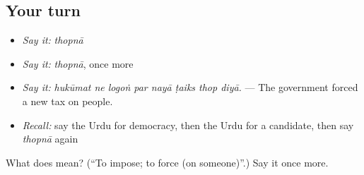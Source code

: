 \subsection*{Your turn}
\begin{itemize}
\raggedright
  \item \emph{Say it:} \emph{thopnā}
  \item \emph{Say it:} \emph{thopnā}, once more
  \item \emph{Say it:} \emph{hukūmat ne logoṅ par nayā ṭaiks thop diyā.} — The government forced a new tax on people.
  \item \emph{Recall:} say the Urdu for democracy, then the Urdu for a candidate, then say \emph{thopnā} again
\end{itemize}

\begin{tcolorbox}[breakable,colback=teal!4,colframe=teal!35!black,title={Before you move on}]
What does  mean? (\textquotedblleft{}To impose; to force (on someone)\textquotedblright{}.) Say it once more.
\end{tcolorbox}
